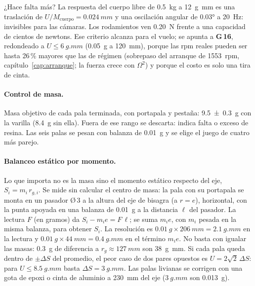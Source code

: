 ¿Hace falta más? La respuesta del cuerpo libre de \SI{0.5}{kg} a \SI{12}{g.mm} es una
traslación de $U/M_{\text{cuerpo}}=\SI{0.024}{mm}$ y una oscilación angular de
\ang{0.03} a \SI{20}{Hz}: invisibles para las cámaras. Los rodamientos ven \SI{0.20}{N}
frente a una capacidad de cientos de newtons. Ese criterio alcanza para el vuelo; se
apunta a \textbf{G\,16}, redondeado a $U\le\SI{6}{g.mm}$ (\SI{0.05}{g} a \SI{120}{mm}),
porque las rpm reales pueden ser hasta 26\,\% mayores que las de régimen (sobrepaso del
arranque de \num{1553}~rpm, capítulo~\ref{cap:arranque}; la fuerza crece con
$\Omega^2$) y porque el costo es solo una tira de cinta.

\paragraph{Control de masa.} Masa objetivo de cada pala terminada, con portapala y
pestaña: \SI{9.5 \pm 0.3}{g} con la varilla (\SI{8.4}{g} sin ella). Fuera de ese rango
se descarta: indica falta o exceso de resina. Las seis palas se pesan con balanza de
\SI{0.01}{g} y se elige el juego de cuatro más parejo.

\paragraph{Balanceo estático por momento.} Lo que importa no es la masa sino el momento
estático respecto del eje, $S_i=m_i\,r_{g,i}$. Se mide sin calcular el centro de masa: la
pala con su portapala se monta en un pasador Ø\,3 a la altura del eje de bisagra (a
$r=e$), horizontal, con la punta apoyada en una balanza de \SI{0.01}{g} a la distancia
$\ell$ del pasador. La lectura $F$ (en gramos) da $S_i - m_i e = F\,\ell$; se suma $m_i e$,
con $m_i$ pesada en la misma balanza, para obtener $S_i$. La resolución es
$\SI{0.01}{g}\times\SI{206}{mm}=\SI{2.1}{g.mm}$ en la lectura y
$\SI{0.01}{g}\times\SI{44}{mm}=\SI{0.4}{g.mm}$ en el término $m_i e$. No basta con igualar
las masas: \SI{0.3}{g} de diferencia a $r_g\approx\SI{127}{mm}$ son \SI{38}{g.mm}. Si cada pala queda dentro de
$\pm\Delta S$ del promedio, el peor caso de dos pares opuestos es
$U=2\sqrt2\,\Delta S$: para $U\le\SI{8.5}{g.mm}$ basta $\Delta S=\SI{3}{g.mm}$. Las palas
livianas se corrigen con una gota de epoxi o cinta de aluminio a \SI{230}{mm} del eje
($\SI{3}{g.mm}$ son \SI{0.013}{g}).

